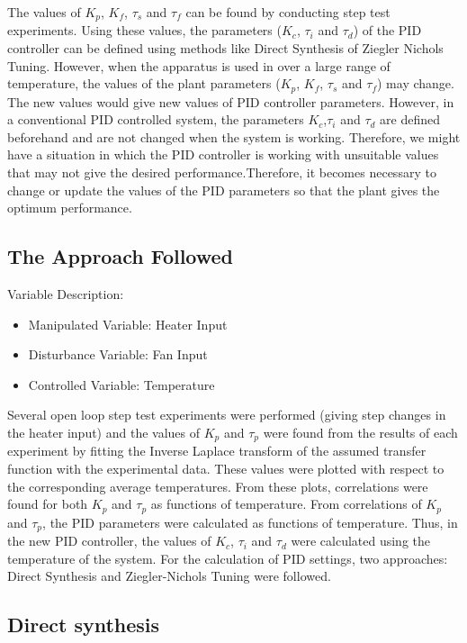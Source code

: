 The values of $K_p$, $K_f$, $\tau_s$ and $\tau_f$ can be found by conducting step test experiments. Using these values, 
the parameters ($K_c$,  $\tau_i$ and  $\tau_d$) of the PID controller can be defined using methods like 
Direct Synthesis of Ziegler Nichols Tuning.
However, when the apparatus is used in over a large range of temperature, the values of the plant parameters 
($K_p$, $K_f$, $\tau_s$ and $\tau_f$) may change. The new values would give new values of PID controller parameters. 
However, in a conventional PID controlled system, the parameters $K_c$,$\tau_i$ and $\tau_d$ are defined beforehand and are 
not changed when the system is working. Therefore, we might have a situation in which the PID controller is working with 
unsuitable values that may not give the desired performance.Therefore, it becomes necessary to change or update the values of 
the PID parameters so that the plant gives the optimum performance.
\newpage
\subsection{The Approach Followed}
Variable Description:
\begin{itemize}
	\item  Manipulated Variable: Heater Input
	\item  Disturbance Variable: Fan Input
	\item  Controlled Variable: Temperature
\end{itemize}

Several open loop step test experiments were performed (giving step changes in the heater input) and the values of 
$K_p$ and $\tau_p$  were found from the results of each experiment by fitting the Inverse Laplace transform of the 
assumed transfer function with the experimental data. These values were plotted with respect to the corresponding
average temperatures. From these plots, correlations were found for both $K_p$ and $\tau_p$ as functions of temperature. 
From correlations of $K_p$ and $\tau_p$, the PID parameters were calculated as functions of temperature. Thus, in the 
new PID controller, the values of $K_c$, $\tau_i$ and $\tau_d$ were calculated using the temperature of the system. For 
the calculation of PID settings, two approaches: Direct Synthesis and Ziegler-Nichols Tuning were followed.



\subsection{Direct synthesis}

